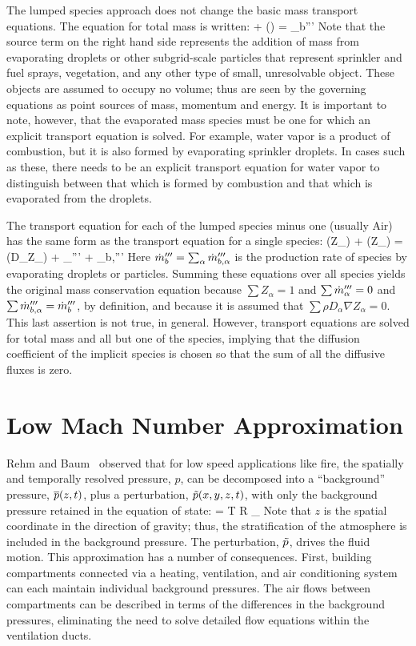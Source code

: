 The lumped species approach does not change the basic mass transport equations. The equation for total mass is written:
\be {} + \nabla\!\cdot (\rho \bu)  =  \dm_b'''  \label{mass} \ee
Note that the source term on the right hand side represents the addition of mass from evaporating droplets or other subgrid-scale
particles that represent sprinkler and fuel sprays, vegetation, and any other type of small, unresolvable object. These
objects are assumed to occupy no volume; thus are seen by the governing equations as point sources of mass, momentum and energy. It is important to 
note, however, that the evaporated mass species must be one for which an explicit transport equation is solved. For example, water vapor is a product of
combustion, but it is also formed by evaporating sprinkler droplets. In cases such as these, there needs to be an explicit transport equation for water
vapor to distinguish between that which is formed by combustion and that which is evaporated from the droplets. 

The transport equation for each of the lumped species minus one (usually Air) has the same form as the transport equation for a single species: 
\be {}(\rho Z_\alpha) + \nabla\!\cdot (\rho Z_\alpha \bu) = \nabla\!\cdot (\rho D_\alpha \nabla Z_\alpha) + \dm_\alpha''' + \dm_{b,\alpha}''' \label{species} \ee
Here $\dot{m}_b'''=\sum_\alpha \dot{m}_{b,\alpha}'''$ is the production rate of species by evaporating droplets or particles.
Summing these equations over all species yields the original mass conservation equation because
$\sum Z_\alpha=1$ and $\sum \dot{m}_\alpha''' = 0$ and $\sum \dot{m}_{b,\alpha}'''=\dot{m}_b'''$, by definition, and because it is assumed
that $\sum \rho D_\alpha \nabla Z_\alpha = 0$. This last assertion is not true, in general.
However, transport equations are solved for total
mass and all but one of the species, implying that the diffusion coefficient of the implicit species is
chosen so that the sum of all the diffusive fluxes is zero.

\section{Low Mach Number Approximation}

Rehm and Baum~\cite{Rehm:1} observed that for low speed applications like fire, the spatially and temporally resolved pressure, $p$, can be decomposed into a ``background'' pressure, $\overline{p}(z,t)$, plus a perturbation, $\tilde{p}(x,y,z,t)$, with only the background pressure retained in the equation of state:
\be \bp = \rho T {\cal R} \sum_\alpha  {} \equiv {}  \label{basicstate1} \ee
Note that $z$ is the spatial coordinate in the direction of gravity; thus, the stratification of the atmosphere is included in the background pressure. The perturbation, $\tilde{p}$, drives the fluid motion. This approximation has a number of consequences. First, building compartments connected via a heating, ventilation, and air conditioning system can each maintain individual background pressures. The air flows between compartments can be
described in terms of the differences in the background pressures, eliminating the need to solve detailed flow equations within the ventilation ducts.

